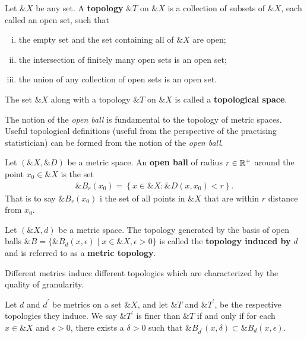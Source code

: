 \begin{definition}
  Let $\&X$ be any set. A \textbf{topology} $\&T$ on $\&X$ is a
  collection of subsets of $\&X$, each called an open set, such that
  \begin{enumerate}[(i)]
  \item the empty set and the set containing all of $\&X$ are open;
  \item the intersection of finitely many open sets is an open set;
  \item the union of any collection of open sets is an open set.
  \end{enumerate} The set $\&X$ along with a topology $\&T$ on $\&X$
  is called a \textbf{topological space}.
\end{definition}

The notion of the \textit{open ball} is fundamental to the topology of metric
spaces.  Useful topological definitions (useful from the perspective
of the practising statistician) can be formed from the notion of the
\textit{open ball}.

\begin{definition}
  Let $(\&X, \&D)$ be a metric space. An \textbf{open ball} of radius
  $r \in \mathbb{R}^+$ around the point $x_0 \in \&X$ is the set
  \begin{align}
    \&B_r(x_0) = \left\{ x \in \&X : \&D(x,x_0) < r \right\}.
  \end{align}
  That is to say $\&B_r(x_0)$ i the set of all points in $\&X$ that
  are within $r$ distance from $x_0$.
\end{definition}

\begin{definition}%
  \label{def:topology}
  Let $(\&X, d)$ be a metric space.  The topology generated by the
  basis of open balls
  $\&B = \{\&B_d(x, \epsilon) \mid x \in \&X, \epsilon > 0\}$ is
  called the \textbf{topology induced by} $d$ and is referred to as a
  \textbf{metric topology}.
\end{definition}

Different metrics induce different topologies which are characterized
by the quality of granularity.

\begin{theorem}
  Let $d$ and $d^\prime$ be metrics on  a set $\&X$, and let $\&T$ and
  $\&T^\prime$,  be the  respective  topologies they  induce.  We  say
  $\&T^\prime$ is finer than $\&T$ if and only if for each $x \in \&X$
  and  $\epsilon  >  0$,  there  exists  a  $\delta  >  0$  such  that
  $\&B_{d^\prime}(x, \delta) \subset \&B_d(x, \epsilon)$.
\end{theorem}

